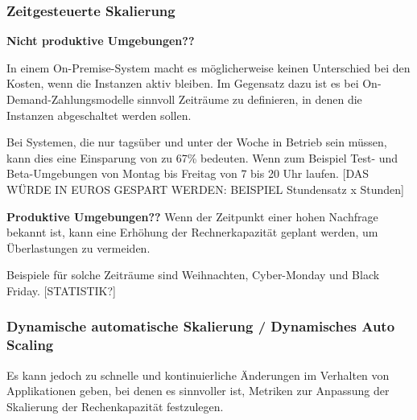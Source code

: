 
\subsubsection{Zeitgesteuerte Skalierung}
\textbf{Nicht produktive Umgebungen??}

In einem On-Premise-System macht es möglicherweise keinen Unterschied bei den Kosten, wenn die Instanzen aktiv bleiben. 
Im Gegensatz dazu ist es bei On-Demand-Zahlungsmodelle sinnvoll Zeiträume zu definieren, in denen die Instanzen abgeschaltet werden sollen.

Bei Systemen, die nur tagsüber und unter der Woche in Betrieb sein müssen, kann dies eine Einsparung von zu 67\% bedeuten.  Wenn zum Beispiel Test- und Beta-Umgebungen von Montag bis Freitag von 7 bis 20 Uhr laufen.
[DAS WÜRDE IN EUROS GESPART WERDEN: BEISPIEL Stundensatz x Stunden]


\textbf{Produktive Umgebungen??}
Wenn der Zeitpunkt einer hohen Nachfrage bekannt ist, kann eine Erhöhung der Rechnerkapazität geplant werden, um Überlastungen zu vermeiden.

Beispiele für solche Zeiträume sind Weihnachten, Cyber-Monday und Black Friday. 
[STATISTIK?]

\subsubsection{Dynamische automatische Skalierung / Dynamisches Auto Scaling}
Es kann jedoch zu schnelle und kontinuierliche Änderungen im Verhalten von Applikationen geben, bei denen es sinnvoller ist, Metriken zur Anpassung der Skalierung der Rechenkapazität festzulegen.

